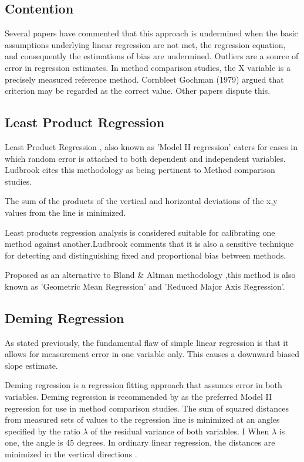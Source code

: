 \documentclass[MAIN.tex]{subfiles}
\begin{document}
\subsection{Contention }
Several papers have commented that this approach is undermined
when the basic assumptions underlying linear regression are not
met, the regression equation, and consequently the estimations of
bias are undermined. Outliers are a source of error in regression
estimates. In method comparison studies, the X variable is a
precisely measured reference method. Cornbleet Gochman (1979)
argued that criterion may be regarded as the correct value. Other
papers dispute this.

\subsection{Least Product Regression}
Least Product Regression , also known as 'Model II regression'
caters for cases in which random error is attached to both
dependent and independent variables. Ludbrook cites this
methodology as being pertinent to Method comparison studies.


The sum of the products of the vertical and horizontal deviations
of the x,y values from the line is minimized.

Least products regression analysis is considered suitable for
calibrating one method against another.Ludbrook comments that it
is also a sensitive technique for detecting and distinguishing
fixed and proportional bias between methods.

Proposed as an alternative to Bland \& Altman methodology ,this
method is also known as 'Geometric Mean Regression' and 'Reduced
Major Axis Regression'.



	\subsection{Deming Regression}
	
	As stated previously, the fundamental flaw of simple linear regression is that it allows for measurement error in one variable only. This causes a downward biased slope estimate.
	
	Deming regression is a regression fitting approach that assumes error in both variables. Deming regression is recommended by \citet*{CornCoch} as the
	preferred Model II regression for use in method comparison studies.
	The sum of squared distances from measured sets of values to the regression line is minimized at an angles specified by the ratio $\lambda$ of the residual variance of both variables. I
	When $\lambda$ is one, the angle is 45 degrees. In ordinary linear regression, the distances are minimized in the vertical directions \citep{linnet99}.
	
\end{document}
